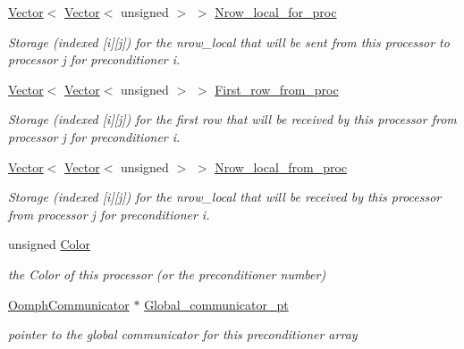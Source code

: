 \begin{DoxyCompactItemize}
\hyperlink{classoomph_1_1Vector}{Vector}$<$ \hyperlink{classoomph_1_1Vector}{Vector}$<$ unsigned $>$ $>$ \hyperlink{classoomph_1_1PreconditionerArray_a513f1f2a2ded6e0b377f58c34bf47647}{Nrow\+\_\+local\+\_\+for\+\_\+proc}
\begin{DoxyCompactList}\small\item\em Storage (indexed \mbox{[}i\mbox{]}\mbox{[}j\mbox{]}) for the nrow\+\_\+local that will be sent from this processor to processor j for preconditioner i. \end{DoxyCompactList}\item 
\hyperlink{classoomph_1_1Vector}{Vector}$<$ \hyperlink{classoomph_1_1Vector}{Vector}$<$ unsigned $>$ $>$ \hyperlink{classoomph_1_1PreconditionerArray_aff927480c2621ca698ac892ccc28b86c}{First\+\_\+row\+\_\+from\+\_\+proc}
\begin{DoxyCompactList}\small\item\em Storage (indexed \mbox{[}i\mbox{]}\mbox{[}j\mbox{]}) for the first row that will be received by this processor from processor j for preconditioner i. \end{DoxyCompactList}\item 
\hyperlink{classoomph_1_1Vector}{Vector}$<$ \hyperlink{classoomph_1_1Vector}{Vector}$<$ unsigned $>$ $>$ \hyperlink{classoomph_1_1PreconditionerArray_aa48322538496f9f1b6d2d89666972ac4}{Nrow\+\_\+local\+\_\+from\+\_\+proc}
\begin{DoxyCompactList}\small\item\em Storage (indexed \mbox{[}i\mbox{]}\mbox{[}j\mbox{]}) for the nrow\+\_\+local that will be received by this processor from processor j for preconditioner i. \end{DoxyCompactList}\item 
unsigned \hyperlink{classoomph_1_1PreconditionerArray_a5012c60980bdbffb480209a111e771a7}{Color}
\begin{DoxyCompactList}\small\item\em the Color of this processor (or the preconditioner number) \end{DoxyCompactList}\item 
\hyperlink{classoomph_1_1OomphCommunicator}{Oomph\+Communicator} $\ast$ \hyperlink{classoomph_1_1PreconditionerArray_a6d5b7cce152e193ffeb4d30c593c6ae3}{Global\+\_\+communicator\+\_\+pt}
\begin{DoxyCompactList}\small\item\em pointer to the global communicator for this preconditioner array \end{DoxyCompactList}\item 

\end{DoxyCompactItemize}

